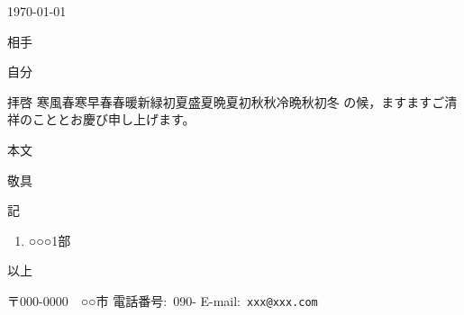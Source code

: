 \documentclass[10pt,a4j,uplatex]{jsarticle}
\def\挨拶{\noindent 拝啓\hspace{1zw}\ifcase\month\or
寒風\or 春寒\or 早春\or 春暖\or 新緑\or 初夏\or 盛夏\or 晩夏\or 初秋\or 秋冷\or 晩秋\or 初冬\fi
の候，ますますご清祥のこととお慶び申し上げます。}
\begin{document}
\begin{flushright}
\today
\end{flushright}
\begin{flushleft}
相手
\end{flushleft}
\begin{flushright}
自分
\end{flushright}

\vspace{\baselineskip}

\挨拶

本文

\hfill
敬具

\vspace{\baselineskip}

{\centering
記
\begin{center}
\begin{minipage}{.9\textwidth}
\begin{enumerate}
	\item ○○○\dotfill 1部
\end{enumerate}
\begin{flushright}
以上
\end{flushright}
\end{minipage}
\end{center}
}
\vfill

\hfill
\vbox{
\hbox{}
\hbox{〒000-0000　○○市}
\hbox{電話番号: 090-}
\hbox{E-mail: \texttt{\small xxx@xxx.com}}
}
\end{document}

